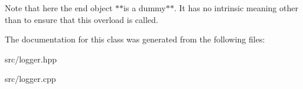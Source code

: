 \-Note that here the end object $\ast$$\ast$is a dummy$\ast$$\ast$. \-It has no intrinsic meaning other than to ensure that this overload is called. 

\-The documentation for this class was generated from the following files\-:\begin{DoxyCompactItemize}
\item 
src/logger.\-hpp\item 
src/logger.\-cpp\end{DoxyCompactItemize}
